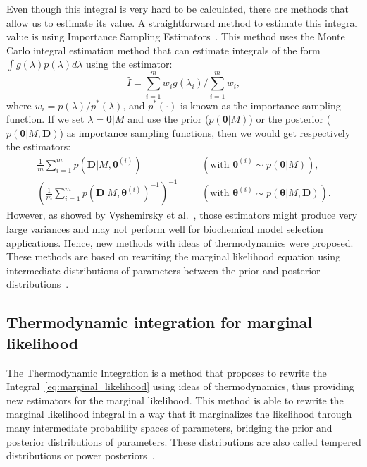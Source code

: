 Even though this integral is very hard to be calculated, there are 
methods that allow us to estimate its value. A straightforward method 
to estimate this integral value is using Importance Sampling 
Estimators~\cite{Newton1993}. This method uses the Monte Carlo integral 
estimation method that can estimate integrals of the form 
$\int g(\lambda) p(\lambda)d\lambda$ using the estimator:
\begin{equation*}
    \hat{I} = \sum_{i = 1}^m w_i g(\lambda_i) / \sum_{i = 1}^m w_i,
\label{eq:importance_sampling_estimator}
\end{equation*}
where $w_i = p (\lambda) / p^* (\lambda)$, and $p^*(\cdot)$ is known as 
the importance sampling function. If we set $\lambda = {\bm\theta} | M$ 
and use the prior ($p({\bm \theta} | M)$) or the posterior ($p({\bm
\theta} | M, {\bm D})$) as importance sampling functions, then we would
get respectively the estimators:
\begin{equation*}
\begin{aligned}
    \frac{1}{m} \sum_{i = 1}^m p({\bm D}|M, {\bm \theta}^{(i)}) &&& 
        (\text{with } {\bm \theta}^{(i)} \sim p({\bm \theta}|M)), \\
    \left(\frac{1}{m} \sum_{i = 1}^m p({\bm D}|M, 
            {\bm \theta}^{(i)})^{-1} \right)^{-1} &&&
        (\text{with } {\bm \theta}^{(i)} \sim p({\bm \theta}|M, 
            {\bm D})).
\end{aligned}
\end{equation*}
However, as showed by Vyshemirsky et al.~\cite{Vyshemirsky2007}, those estimators might
produce very large variances and may not perform well for biochemical
model selection applications. Hence, new methods with ideas of 
thermodynamics were proposed. These methods are based on rewriting the
marginal likelihood equation using intermediate distributions of 
parameters between the prior and posterior 
distributions~\cite{Friel2008}.

\label{sec:thermodynamic_integration}
\subsection{Thermodynamic integration for marginal likelihood}
The Thermodynamic Integration is a method that proposes to rewrite
the Integral~\ref{eq:marginal_likelihood} using ideas of thermodynamics,
thus providing new estimators for the marginal likelihood. This method is
able to rewrite the marginal likelihood integral in a way that it 
marginalizes the likelihood through many intermediate probability spaces 
of parameters, bridging the prior and posterior distributions of 
parameters. These distributions are also called tempered distributions
or power posteriors~\cite{Friel2008}.

